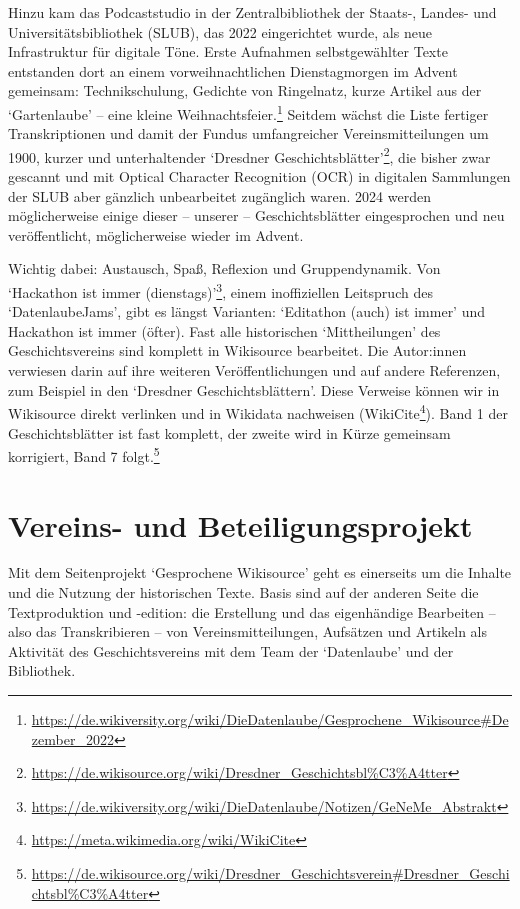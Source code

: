 \documentclass[a4paper,
fontsize=11pt,
oneside,
numbers=noperiodatend,
parskip=half-,
bibliography=totoc,
final
]{scrartcl}
\begin{document}
Hinzu kam das Podcaststudio in der Zentralbibliothek der Staats-,
Landes- und Universitätsbibliothek (SLUB), das 2022 eingerichtet wurde,
als neue Infrastruktur für digitale Töne. Erste Aufnahmen
selbstgewählter Texte entstanden dort an einem vorweihnachtlichen
Dienstagmorgen im Advent gemeinsam: Technikschulung, Gedichte von
Ringelnatz, kurze Artikel aus der \enquote*{Gartenlaube} -- eine kleine
Weihnachtsfeier.\footnote{\url{https://de.wikiversity.org/wiki/DieDatenlaube/Gesprochene_Wikisource\#Dezember_2022}}
Seitdem wächst die Liste fertiger Transkriptionen und damit der Fundus
umfangreicher Vereinsmitteilungen um 1900, kurzer und unterhaltender
\enquote*{Dresdner Geschichtsblätter}\footnote{\url{https://de.wikisource.org/wiki/Dresdner_Geschichtsbl\%C3\%A4tter}},
die bisher zwar gescannt und mit Optical Character Recognition (OCR) in
digitalen Sammlungen der SLUB aber gänzlich unbearbeitet zugänglich
waren. 2024 werden möglicherweise einige dieser -- unserer --
Geschichtsblätter eingesprochen und neu veröffentlicht, möglicherweise
wieder im Advent.

Wichtig dabei: Austausch, Spaß, Reflexion und Gruppendynamik. Von
\enquote*{Hackathon ist immer (dienstags)}\footnote{\url{https://de.wikiversity.org/wiki/DieDatenlaube/Notizen/GeNeMe_Abstrakt}},
einem inoffiziellen Leitspruch des \enquote*{DatenlaubeJams}, gibt es
längst Varianten: \enquote*{Editathon (auch) ist immer} und Hackathon
ist immer (öfter). Fast alle historischen \enquote*{Mittheilungen} des
Geschichtsvereins sind komplett in Wikisource bearbeitet. Die
Autor:innen verwiesen darin auf ihre weiteren Veröffentlichungen und auf
andere Referenzen, zum Beispiel in den \enquote*{Dresdner
Geschichtsblättern}. Diese Verweise können wir in Wikisource direkt
verlinken und in Wikidata nachweisen (WikiCite\footnote{\url{https://meta.wikimedia.org/wiki/WikiCite}}).
Band 1 der Geschichtsblätter ist fast komplett, der zweite wird in Kürze
gemeinsam korrigiert, Band 7 folgt.\footnote{\url{https://de.wikisource.org/wiki/Dresdner_Geschichtsverein\#Dresdner_Geschichtsbl\%C3\%A4tter}}

\hypertarget{vereins--und-beteiligungsprojekt}{%
\section{Vereins- und
Beteiligungsprojekt}\label{vereins--und-beteiligungsprojekt}}

Mit dem Seitenprojekt \enquote*{Gesprochene Wikisource} geht es
einerseits um die Inhalte und die Nutzung der historischen Texte. Basis
sind auf der anderen Seite die Textproduktion und -edition: die
Erstellung und das eigenhändige Bearbeiten -- also das Transkribieren --
von Vereinsmitteilungen, Aufsätzen und Artikeln als Aktivität des
Geschichtsvereins mit dem Team der \enquote*{Datenlaube} und der
Bibliothek.
\end{document}
